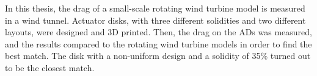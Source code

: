 In this thesis, the drag of a small-scale rotating wind turbine model is measured in a wind tunnel. Actuator disks, with three different solidities and two different layouts, were designed and 3D printed. Then, the drag on the ADs was measured, and the results compared to the rotating wind turbine models in order to find the best match. The disk with a non-uniform design and a solidity of 35\% turned out to be the closest match. 




